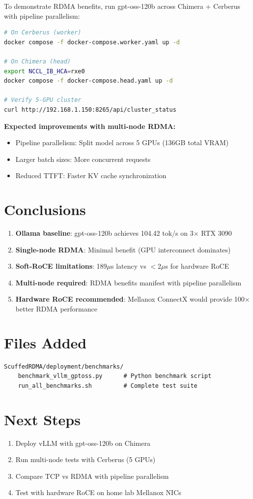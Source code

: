\documentclass[10pt,letterpaper]{article}
\begin{document}
To demonstrate RDMA benefits, run gpt-oss-120b across Chimera + Cerberus with pipeline parallelism:

\begin{lstlisting}[language=bash]
# On Cerberus (worker)
docker compose -f docker-compose.worker.yaml up -d

# On Chimera (head)
export NCCL_IB_HCA=rxe0
docker compose -f docker-compose.head.yaml up -d

# Verify 5-GPU cluster
curl http://192.168.1.150:8265/api/cluster_status
\end{lstlisting}

\textbf{Expected improvements with multi-node RDMA:}
\begin{itemize}[noitemsep]
    \item Pipeline parallelism: Split model across 5 GPUs (136GB total VRAM)
    \item Larger batch sizes: More concurrent requests
    \item Reduced TTFT: Faster KV cache synchronization
\end{itemize}

\section{Conclusions}

\begin{enumerate}[noitemsep]
    \item \textbf{Ollama baseline}: gpt-oss-120b achieves 104.42 tok/s on 3$\times$ RTX 3090
    \item \textbf{Single-node RDMA}: Minimal benefit (GPU interconnect dominates)
    \item \textbf{Soft-RoCE limitations}: 189$\mu$s latency vs $<$2$\mu$s for hardware RoCE
    \item \textbf{Multi-node required}: RDMA benefits manifest with pipeline parallelism
    \item \textbf{Hardware RoCE recommended}: Mellanox ConnectX would provide 100$\times$ better RDMA performance
\end{enumerate}

\section{Files Added}

\begin{lstlisting}
ScuffedRDMA/deployment/benchmarks/
    benchmark_vllm_gptoss.py      # Python benchmark script
    run_all_benchmarks.sh         # Complete test suite
\end{lstlisting}

\section{Next Steps}

\begin{enumerate}[noitemsep]
    \item Deploy vLLM with gpt-oss-120b on Chimera
    \item Run multi-node tests with Cerberus (5 GPUs)
    \item Compare TCP vs RDMA with pipeline parallelism
    \item Test with hardware RoCE on home lab Mellanox NICs
\end{enumerate}
\end{document}
